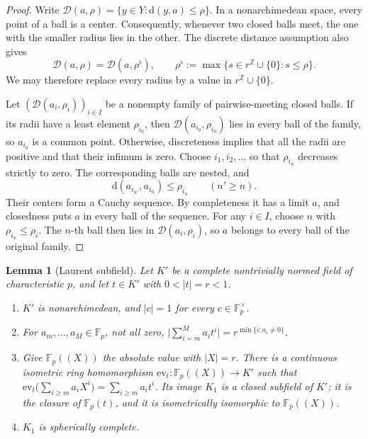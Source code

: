 \documentclass[11pt]{amsart}
\newtheorem{lemma}[theorem]{Lemma}
\theoremstyle{definition}
\theoremstyle{remark}
\numberwithin{equation}{section}
\newcommand{\Z}{\mathbb Z}
\newcommand{\F}{\mathbb F}
\newcommand{\abs}[1]{\lvert #1\rvert}
\newcommand{\cD}{\mathcal{D}}
\begin{document}
\begin{proof}
Write $\cD(a,\rho)=\{y\in Y:\mathrm d(y,a)\le\rho\}$. In a nonarchimedean space, every point of a ball is a center.
Consequently, whenever two closed balls meet, the one with the smaller radius lies in the other.
The discrete distance assumption also gives
\[
\cD(a,\rho)=\cD(a,\rho^\flat),\qquad
\rho^\flat:=\max\{s\in r^\Z\cup\{0\}:s\le\rho\}.
\]
We may therefore replace every radius by a value in $r^\Z\cup\{0\}$.

Let $(\cD(a_i,\rho_i))_{i\in I}$ be a nonempty family of pairwise-meeting closed balls. If its radii have a least
element $\rho_{i_0}$, then $\cD(a_{i_0},\rho_{i_0})$ lies in every ball of the family, so $a_{i_0}$ is a common point.
Otherwise, discreteness implies that all the radii are positive and that their infimum is zero. Choose
$i_1,i_2,\dots$ so that $\rho_{i_n}$ decreases strictly to zero. The corresponding balls are nested, and
\[
\mathrm d(a_{i_{n'}},a_{i_n})\le\rho_{i_n}\qquad(n'\ge n).
\]
Their centers form a Cauchy sequence. By completeness it has a limit $a$, and closedness puts $a$ in every ball
of the sequence. For any $i\in I$, choose $n$ with $\rho_{i_n}\le\rho_i$. The $n$\nobreakdash-th ball then lies in
$\cD(a_i,\rho_i)$, so $a$ belongs to every ball of the original family.
\end{proof}



\begin{lemma}[Laurent subfield]\label{lem:laurentsub}
Let $K'$ be a complete nontrivially normed field of characteristic $p$, and let $t\in K'$ with $0<\abs t=r<1$.
\begin{enumerate}
\item $K'$ is nonarchimedean, and $\abs c=1$ for every $c\in\F_p^\times$.
\item For $a_m,\dots,a_M\in\F_p$, not all zero, $\bigl\lvert\sum_{i=m}^Ma_it^i\bigr\rvert=r^{\min\{i:a_i\ne0\}}$.
\item Give $\F_p((X))$ the absolute value with $\abs X=r$. There is a continuous isometric ring homomorphism
$\mathrm{ev}_t\colon\F_p((X))\to K'$ such that
$\mathrm{ev}_t\bigl(\sum_{i\ge m}a_iX^i\bigr)=\sum_{i\ge m}a_it^i$. Its image
$K_1$ is a closed subfield of $K'$; it is the closure of $\F_p(t)$, and it is isometrically isomorphic to $\F_p((X))$.
\item $K_1$ is spherically complete.
\end{enumerate}
\end{lemma}
\end{document}
